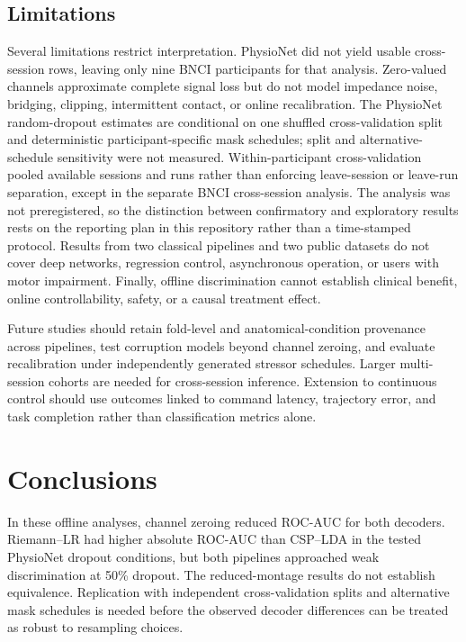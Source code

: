 \documentclass[11pt]{article}
\begin{document}
\subsection{Limitations}
Several limitations restrict interpretation. PhysioNet did not yield usable cross-session rows, leaving only nine BNCI participants for that analysis. Zero-valued channels approximate complete signal loss but do not model impedance noise, bridging, clipping, intermittent contact, or online recalibration. The PhysioNet random-dropout estimates are conditional on one shuffled cross-validation split and deterministic participant-specific mask schedules; split and alternative-schedule sensitivity were not measured. Within-participant cross-validation pooled available sessions and runs rather than enforcing leave-session or leave-run separation, except in the separate BNCI cross-session analysis. The analysis was not preregistered, so the distinction between confirmatory and exploratory results rests on the reporting plan in this repository rather than a time-stamped protocol. Results from two classical pipelines and two public datasets do not cover deep networks, regression control, asynchronous operation, or users with motor impairment. Finally, offline discrimination cannot establish clinical benefit, online controllability, safety, or a causal treatment effect.

Future studies should retain fold-level and anatomical-condition provenance across pipelines, test corruption models beyond channel zeroing, and evaluate recalibration under independently generated stressor schedules. Larger multi-session cohorts are needed for cross-session inference. Extension to continuous control should use outcomes linked to command latency, trajectory error, and task completion rather than classification metrics alone.

\section{Conclusions}
In these offline analyses, channel zeroing reduced ROC-AUC for both decoders. Riemann--LR had higher absolute ROC-AUC than CSP--LDA in the tested PhysioNet dropout conditions, but both pipelines approached weak discrimination at 50\% dropout. The reduced-montage results do not establish equivalence. Replication with independent cross-validation splits and alternative mask schedules is needed before the observed decoder differences can be treated as robust to resampling choices.
\end{document}
